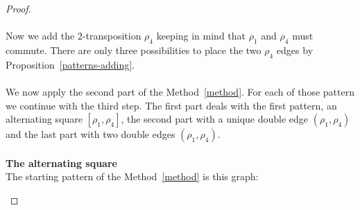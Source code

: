\begin{proof}
\paragraph{}
Now we add the 2-transposition $\rho_4$ keeping in mind that $\rho_1$ and $\rho_4$ must commute. There are only three possibilities to place the two $\rho_4$ edges by Proposition~\ref{patterns-adding}.

\paragraph{}
We now apply the second part of the Method~\ref{method}. For each of those pattern we continue with the third step. The first part deals with the first pattern, an alternating square $[\rho_1, \rho_4]$, the second part with a unique double edge $(\rho_1, \rho_4)$ and the last part with two double edges $(\rho_1, \rho_4)$.

\paragraph{}
\textbf{The alternating square}\\
The starting pattern of the Method~\ref{method} is this graph:

\begin{figure}[H]
  \begin{center}
\end{center}
\end{figure}
\end{proof}
